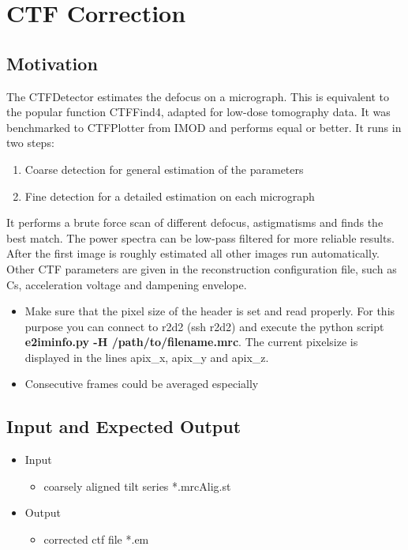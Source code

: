 \documentclass[12pt,a4paper]{scrartcl}
\begin{document}
\section{CTF Correction}

\subsection{Motivation}
The CTFDetector estimates the defocus on a micrograph. This is equivalent to the popular function CTFFind4, adapted for low-dose tomography data. It was benchmarked to CTFPlotter from IMOD and performs equal or better. It runs in two steps:
\begin{enumerate}
\item Coarse detection for general estimation of the parameters 
\item Fine detection for a detailed estimation on each micrograph
\end{enumerate}
It performs a brute force scan of different defocus, astigmatisms and finds the best match. The power spectra can be low-pass filtered for more reliable results. After the first image is roughly estimated all other images run automatically. Other CTF parameters are given in the reconstruction configuration file, such as Cs, acceleration voltage and dampening envelope.
\begin{itemize}
\item Make sure that the pixel size of the header is set and read properly. For this purpose you can connect to r2d2 (ssh r2d2) and execute the python script \textbf{e2iminfo.py -H /path/to/filename.mrc}. The current pixelsize is displayed in the lines apix\_x, apix\_y and apix\_z.  
\item Consecutive frames could be averaged especially
\end{itemize}

\subsection{Input and Expected Output}

\begin{itemize}
\item Input
\begin{itemize}
\item coarsely aligned tilt series *.mrcAlig.st
\end{itemize}
\item Output
\begin{itemize}
\item corrected ctf file *.em
\end{itemize}
\end{itemize}
\end{document}
